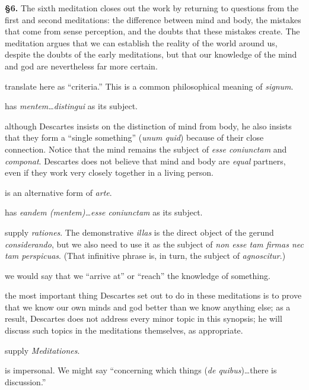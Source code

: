 \prenotes

\textbf{§6.} The sixth meditation closes out the work by returning to questions from the first and second meditations: the difference between mind and body, the mistakes that come from sense perception, and the doubts that these mistakes create. The meditation argues that we can establish the reality of the world around us, despite the doubts of the early meditations, but that our knowledge of the mind and god are nevertheless far more certain.

 translate here as ``criteria.'' This is a common philosophical meaning of \textit{signum}.

 has \textit{mentem\dots distingui} as its subject.

 although Descartes insists on the distinction of mind from body, he also insists that they form a ``single something'' (\textit{unum quid}) because of their close connection. Notice that the mind remains the subject of \textit{esse coniunctam} and \textit{componat}. Descartes does not believe that mind and body are \textit{equal} partners, even if they work very closely together in a living person.

 is an alternative form of \textit{arte}.

 has \textit{eandem (mentem)\dots esse coniunctam} as its subject.

 supply \textit{rationes}. The demonstrative \textit{illas} is the direct object of the gerund \textit{considerando}, but we also need to use it as the subject of \textit{non esse tam firmas nec tam perspicuas}. (That infinitive phrase is, in turn, the subject of \textit{agnoscitur}.)

 we would say that we ``arrive at'' or ``reach'' the knowledge of something.

 the most important thing Descartes set out to do in these meditations is to prove that we know our own minds and god better than we know anything else; as a result, Descartes does not address every minor topic in this synopsis; he will discuss such topics in the meditations themselves, as appropriate.

 supply \textit{Meditationes}.

 is impersonal. We might say ``concerning which things (\textit{de quibus})\dots there is discussion.''


